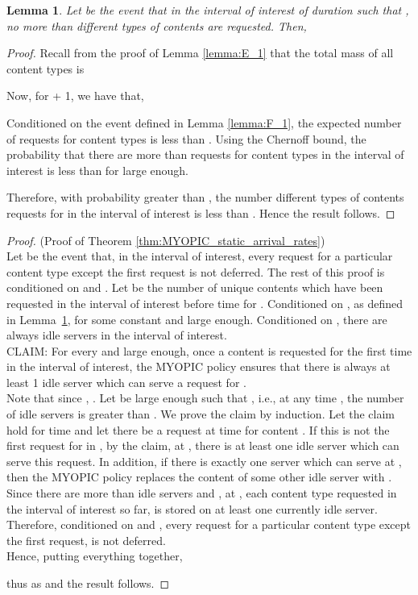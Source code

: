 \documentclass[10pt, conference, letterpaper]{IEEEtran}
\newtheorem{lemma}{Lemma}
\begin{document}
\begin{lemma}
	\label{lemma:types_of_arrivals}
	Let  be the event that in the interval of interest of duration  such that , no more than  different types of contents are requested. Then,
	
\end{lemma}
\begin{proof}
	Recall from the proof of Lemma \ref{lemma:E_1} that the total mass of all content types  is
	
	Now, for  + 1, we have that,
	
	Conditioned on the event  defined in Lemma \ref{lemma:F_1}, the expected number of requests for content types  is less than . Using the Chernoff bound, the probability that there are more than  requests for content types  in the interval of interest is less than  for  large enough.
	
	Therefore, with probability greater than , the number different types of contents requests for in the interval of interest is less than . Hence the result follows.
\end{proof}


\begin{proof} (Proof of Theorem \ref{thm:MYOPIC_static_arrival_rates})\\
	Let  be the event that, in the interval of interest, every request for a particular content type except the first request is not deferred.
	The rest of this proof is conditioned on  and . Let  be the number of unique contents which have been requested in the interval of interest before time  for . Conditioned on , as defined in Lemma~\ref{lemma:types_of_arrivals},  for some constant  and  large enough. Conditioned on , there are always  idle servers in the interval of interest. \\
	\newline CLAIM: For every  and  large enough, once a content  is requested for the first time in the interval of interest, the MYOPIC policy ensures that there is always at least 1 idle server which can serve a request for .\\
	\newline Note that since , . Let  be large enough such that , i.e., at any time , the number of idle servers is greater than . We prove the claim by induction. Let the claim hold for time  and let there be a request at time  for content . If this is not the first request for  in , by the claim, at , there is at least one idle server which can serve this request. In addition, if there is exactly one server which can serve  at , then the MYOPIC policy replaces the content of some other idle server with . Since there are more than  idle servers and , at , each content type requested in the interval of interest so far, is stored on at least one currently idle server. Therefore, conditioned on  and , every request for a particular content type except the first request, is not deferred. \\
	\newline Hence, putting everything together,
	
	thus  as  and the result follows.
\end{proof}
\end{document}
